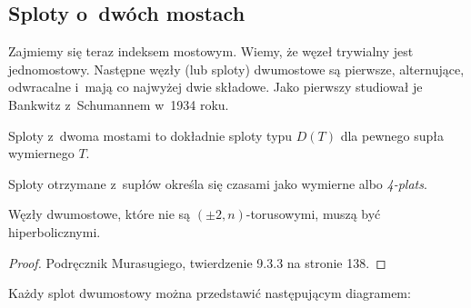 \subsection{Sploty o~dwóch mostach} %
\label{sub:twobridge}


Zajmiemy się teraz indeksem mostowym.
Wiemy, że węzeł trywialny jest jednomostowy.
Następne węzły (lub sploty) dwumostowe są pierwsze, alternujące, odwracalne i~mają co najwyżej dwie składowe.
Jako pierwszy studiował je Bankwitz z~Schumannem w~1934 roku.

\begin{proposition}
\label{prp:two_bridge_tangle}
	Sploty z~dwoma mostami to dokładnie sploty typu $D(T)$ dla pewnego supła wymiernego $T$.
\end{proposition}

Sploty otrzymane z~supłów określa się czasami jako wymierne albo \emph{4-plats}.

\begin{proposition}
\label{prp:two_bridge_hyperbolic}
	Węzły dwumostowe, które nie są $(\pm 2, n)$-torusowymi, muszą być hiperbolicznymi.
\end{proposition}

\begin{proof}
	Podręcznik \cite{murasugi96} Murasugiego, twierdzenie 9.3.3 na stronie 138.
\end{proof}


Każdy splot dwumostowy można przedstawić następującym diagramem:



